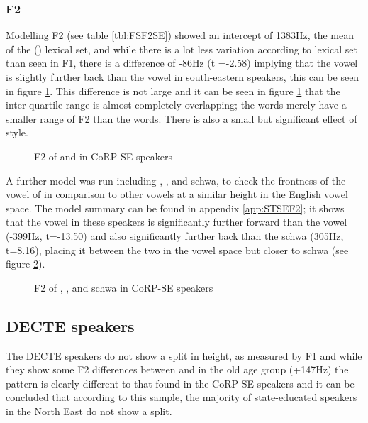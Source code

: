\documentclass[../../../00.FullDoc/tex/ThesisSkeleton-draft2]{subfiles}
\begin{document}
\subsubsection{F2} \label{subsubsec:SEF2}
Modelling F2 (see table \ref{tbl:FSF2SE}) showed an intercept of 1383Hz, the mean of the \foot() lexical set, and while there is a lot less variation according to lexical set than seen in F1, there is a difference of -86Hz (t =-2.58) implying that the \strutt{} vowel is slightly further back than the \foot{} vowel in south-eastern speakers, this can be seen in figure \ref{fig:FSF2SE}. This difference is not large and it can be seen in figure \ref{fig:FSF2SE} that the inter-quartile range is almost completely overlapping; the \strutt{} words merely have a smaller range of F2 than the \foot{} words.
There is also a small but significant effect of style.



\begin{figure}[h]
	
	\caption{F2 of \foot{} and \strutt{} in CoRP-SE speakers} \label{fig:FSF2SE}
\end{figure}

A further model was run including \strutt{}, , and schwa, to check  the frontness of the \strutt{} vowel of in comparison to other vowels at a similar height in the English vowel space. The model summary can be found in appendix \ref{app:STSEF2}; it shows that the \strutt{} vowel in these speakers is significantly further forward than the  vowel (-399Hz, t=-13.50) and also significantly further back than the schwa (305Hz, t=8.16), placing it between the two in the vowel space but closer to schwa (see figure \ref{fig:STF2SE}).

\begin{figure}[h]
	
	\caption{F2 of \strutt{}, , and schwa in CoRP-SE speakers} \label{fig:STF2SE}
\end{figure}



\subsection{DECTE speakers}
The DECTE speakers do not show a split in height, as measured by F1 and while they show some F2 differences between \foot{} and \strutt{} in the old age group (+147Hz) the pattern is clearly different to that found in the CoRP-SE speakers and it can be concluded that according to this sample, the majority of state-educated speakers in the North East do not show a \FS{} split.
\end{document}
